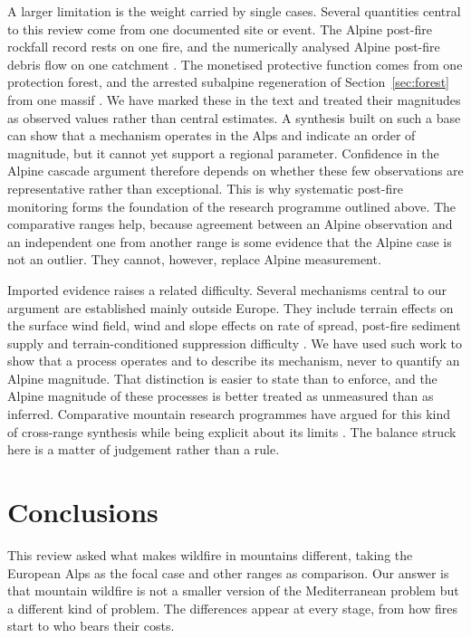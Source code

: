 \documentclass[11pt,a4paper]{article}
\begin{document}
A larger limitation is the weight carried by single cases. Several quantities central to this review come from one documented site or event. The Alpine post-fire rockfall record rests on one fire, and the numerically analysed Alpine post-fire debris flow on one catchment \citep{melzner_brief_2019, laporta_postwildfire_2025}. The monetised protective function comes from one protection forest, and the arrested subalpine regeneration of Section~\ref{sec:forest} from one massif \citep{moos_climate_2021, degiuli_arrested_2024}. We have marked these in the text and treated their magnitudes as observed values rather than central estimates. A synthesis built on such a base can show that a mechanism operates in the Alps and indicate an order of magnitude, but it cannot yet support a regional parameter. Confidence in the Alpine cascade argument therefore depends on whether these few observations are representative rather than exceptional. This is why systematic post-fire monitoring forms the foundation of the research programme outlined above. The comparative ranges help, because agreement between an Alpine observation and an independent one from another range is some evidence that the Alpine case is not an outlier. They cannot, however, replace Alpine measurement.

Imported evidence raises a related difficulty. Several mechanisms central to our argument are established mainly outside Europe. They include terrain effects on the surface wind field, wind and slope effects on rate of spread, post-fire sediment supply and terrain-conditioned suppression difficulty \citep{sharples_overview_2009, hayajneh_wind_2026, morell_sediment_2021, cardil_assessing_2025}. We have used such work to show that a process operates and to describe its mechanism, never to quantify an Alpine magnitude. That distinction is easier to state than to enforce, and the Alpine magnitude of these processes is better treated as unmeasured than as inferred. Comparative mountain research programmes have argued for this kind of cross-range synthesis while being explicit about its limits \citep{payne_nature_2020}. The balance struck here is a matter of judgement rather than a rule.

\section{Conclusions}
\label{sec:conclusions}

This review asked what makes wildfire in mountains different, taking the European Alps as the focal case and other ranges as comparison. Our answer is that mountain wildfire is not a smaller version of the Mediterranean problem but a different kind of problem. The differences appear at every stage, from how fires start to who bears their costs.
\end{document}
